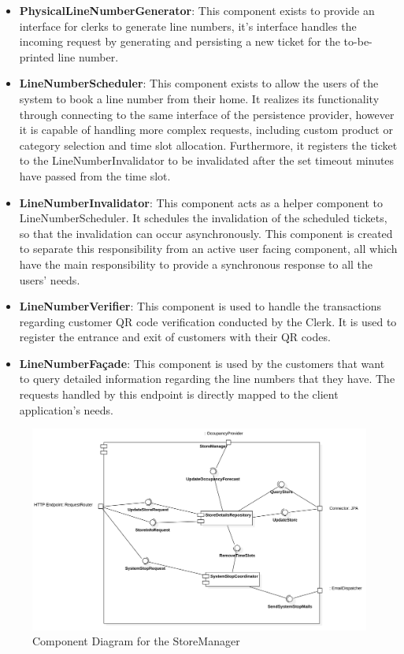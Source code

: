 \begin{itemize}
    \item \textbf{PhysicalLineNumberGenerator}: This component exists to provide an interface for clerks to generate line numbers, it's interface handles the incoming request by generating and persisting a new ticket for the to-be-printed line number.
    \item \textbf{LineNumberScheduler}: This component exists to allow the users of the system to book a line number from their home.
    It realizes its functionality through connecting to the same interface of the persistence provider, however it is capable of handling more complex requests, including custom product or category selection and time slot allocation.
    Furthermore, it registers the ticket to the LineNumberInvalidator to be invalidated after the set timeout minutes have passed from the time slot.
    \item \textbf{LineNumberInvalidator}: This component acts as a helper component to LineNumberScheduler.
    It schedules the invalidation of the scheduled tickets, so that the invalidation can occur asynchronously.
    This component is created to separate this responsibility from an active user facing component, all which have the main responsibility to provide a synchronous response to all the users' needs.
    \item \textbf{LineNumberVerifier}: This component is used to handle the transactions regarding customer QR code verification conducted by the Clerk.
    It is used to register the entrance and exit of customers with their QR codes.
    \item \textbf{LineNumberFa\c{c}ade}: This component is used by the customers that want to query detailed information regarding the line numbers that they have.
    The requests handled by this endpoint is directly mapped to the client application's needs.

\end{itemize}
\begin{figure}[H]
    \centering
    \includegraphics[height=0.4\textwidth]{Images/ComponentDiagrams/StoreManager.png}
    \caption{Component Diagram for the StoreManager}
    \label{fig:CDStoreManager}
\end{figure}

